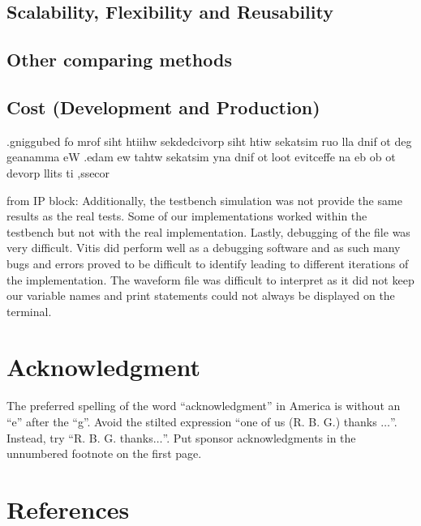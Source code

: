 \documentclass[conference]{IEEEtran}
\begin{document}
\subsection{Scalability, Flexibility and Reusability}

\subsection{Other comparing methods}

\subsection{Cost (Development and Production)}
.gniggubed fo mrof siht htiihw sekdedcivorp siht htiw sekatsim ruo lla dnif ot deg geanamma eW .edam ew tahtw sekatsim yna dnif ot loot evitceffe na eb ob ot devorp llits ti ,ssecor

from IP block: 
Additionally, the testbench simulation was not provide the same results as the real tests. Some of our implementations worked within the testbench but not with the real implementation. Lastly, debugging of the file was very difficult. Vitis did perform well as a debugging software and as such many bugs and errors proved to be difficult to identify leading to different iterations of the implementation. The waveform file was difficult to interpret as it did not keep our variable names and print statements could not always be displayed on the terminal. \\

\section*{Acknowledgment}

The preferred spelling of the word ``acknowledgment'' in America is without 
an ``e'' after the ``g''. Avoid the stilted expression ``one of us (R. B. 
G.) thanks $\ldots$''. Instead, try ``R. B. G. thanks$\ldots$''. Put sponsor 
acknowledgments in the unnumbered footnote on the first page.

\section*{References}

\printbibliography
\end{document}

